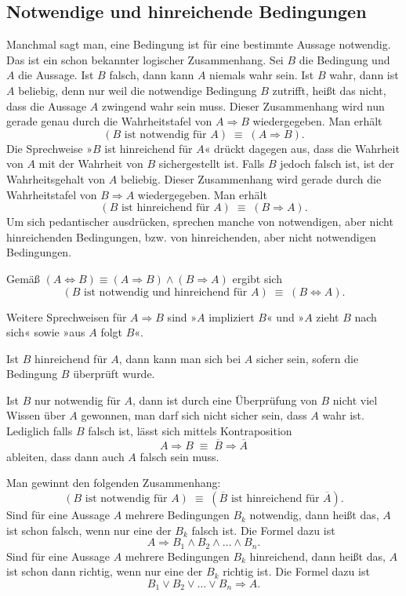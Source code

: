 \newpage
\subsection{Notwendige und hinreichende Bedingungen}

Manchmal sagt man, eine Bedingung ist für eine bestimmte Aussage
notwendig. Das ist ein schon bekannter logischer Zusammenhang.
Sei $B$ die Bedingung und $A$ die Aussage. Ist $B$ falsch, dann
kann $A$ niemals wahr sein. Ist $B$ wahr, dann ist $A$ beliebig,
denn nur weil die notwendige Bedingung $B$ zutrifft, heißt das nicht,
dass die Aussage $A$ zwingend wahr sein muss. Dieser Zusammenhang
wird nun gerade genau durch die Wahrheitstafel von $A\Rightarrow B$
wiedergegeben. Man erhält%
\[(\text{$B$ ist notwendig für $A$})\;\equiv\; (A\Rightarrow B).\]
Die Sprechweise »$B$ ist hinreichend für $A$« drückt dagegen aus,
dass die Wahrheit von $A$ mit der Wahrheit von $B$ sichergestellt
ist. Falls $B$ jedoch falsch ist, ist der Wahrheitsgehalt von $A$
beliebig. Dieser Zusammenhang wird gerade durch die Wahrheitstafel
von $B\Rightarrow A$ wiedergegeben. Man erhält%
\[(\text{$B$ ist hinreichend für $A$})\;\equiv\; (B\Rightarrow A).\]
Um sich pedantischer ausdrücken, sprechen manche von notwendigen,
aber nicht hinreichenden Bedingungen, bzw. von hinreichenden,
aber nicht notwendigen Bedingungen.

Gemäß
$(A\Leftrightarrow B)\equiv (A\Rightarrow B)\land (B\Rightarrow A)$
ergibt sich
\[(\text{$B$ ist notwendig und hinreichend für $A$})\;\equiv\;(B\Leftrightarrow A).\]

\noindent
Weitere Sprechweisen für $A\Rightarrow B$ sind »$A$ impliziert $B$«
und »$A$ zieht $B$ nach sich« sowie »aus $A$ folgt $B$«.

Ist $B$ hinreichend für $A$, dann kann man sich bei $A$ sicher sein,
sofern die Bedingung $B$ überprüft wurde.

Ist $B$ nur notwendig für $A$, dann ist durch eine Überprüfung von $B$
nicht viel Wissen über $A$ gewonnen, man darf sich nicht sicher sein,
dass $A$ wahr ist. Lediglich falls $B$ falsch
ist, lässt sich mittels Kontraposition%
\[A\Rightarrow B\;\equiv\;\overline B\Rightarrow\overline A\]
ableiten, dass dann auch $A$ falsch sein muss.

Man gewinnt den folgenden Zusammenhang:
\[(\text{$B$ ist notwendig für $A$})\;\equiv\;
(\text{$\overline B$ ist hinreichend für $\overline A$}).\]
Sind für eine Aussage $A$ mehrere Bedingungen $B_k$ notwendig,
dann heißt das, $A$ ist schon falsch, wenn nur eine der $B_k$
falsch ist. Die Formel dazu ist
\[A\Rightarrow B_1\land B_2\land\ldots\land B_n.\]
Sind für eine Aussage $A$ mehrere Bedingungen $B_k$ hinreichend,
dann heißt das, $A$ ist schon dann richtig, wenn nur eine der $B_k$
richtig ist. Die Formel dazu ist
\[B_1\lor B_2\lor\ldots\lor B_n\Rightarrow A.\]

